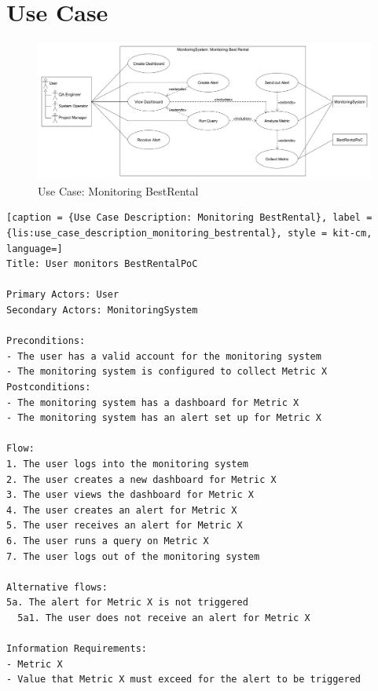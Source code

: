 \section{Use Case}

\begin{figure}[h]
	\centering
	\includegraphics[width=\textwidth]{figures/use_case_monitoring_bestrental.png}
	\caption{Use Case: Monitoring BestRental}
	\label{fig:use_case_monitoring_best_rental}
\end{figure}

\vspace{0.5cm}
\begin{lstlisting}[caption = {Use Case Description: Monitoring BestRental}, label = {lis:use_case_description_monitoring_bestrental}, style = kit-cm, language=] 
Title: User monitors BestRentalPoC

Primary Actors: User
Secondary Actors: MonitoringSystem

Preconditions:  
- The user has a valid account for the monitoring system
- The monitoring system is configured to collect Metric X
Postconditions:  
- The monitoring system has a dashboard for Metric X
- The monitoring system has an alert set up for Metric X

Flow:
1. The user logs into the monitoring system
2. The user creates a new dashboard for Metric X
3. The user views the dashboard for Metric X
4. The user creates an alert for Metric X
5. The user receives an alert for Metric X
6. The user runs a query on Metric X
7. The user logs out of the monitoring system

Alternative flows:
5a. The alert for Metric X is not triggered
  5a1. The user does not receive an alert for Metric X
	
Information Requirements: 
- Metric X
- Value that Metric X must exceed for the alert to be triggered
\end{lstlisting}

